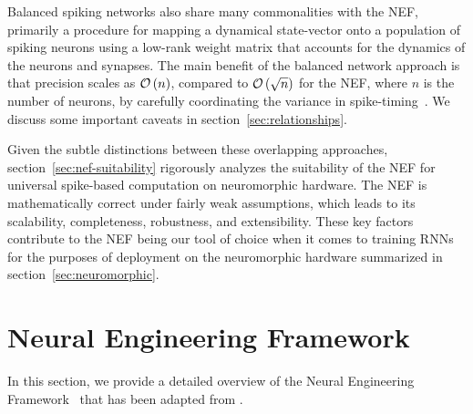 Balanced spiking networks also share many commonalities with the NEF, primarily a procedure for mapping a dynamical state-vector onto a population of spiking neurons using a low-rank weight matrix that accounts for the dynamics of the neurons and synapses.
The main benefit of the balanced network approach is that precision scales as $\mathcal{O}\left({n}\right)$, compared to $\mathcal{O}\left({\sqrt{n}}\right)$ for the NEF, where $n$ is the number of neurons, by carefully coordinating the variance in spike-timing~\citep[][Figure~11]{boahen2017neuromorph}.
We discuss some important caveats in section~\ref{sec:relationships}.

Given the subtle distinctions between these overlapping approaches,
section~\ref{sec:nef-suitability} rigorously analyzes the suitability of the NEF for universal spike-based computation on neuromorphic hardware.
The NEF is mathematically correct under fairly weak assumptions, which leads to its scalability, completeness, robustness, and extensibility.
These key factors contribute to the NEF being our tool of choice when it comes to training RNNs for the purposes of deployment on the neuromorphic hardware summarized in section~\ref{sec:neuromorphic}.

\section{Neural Engineering Framework}
\label{sec:nef}

In this section, we provide a detailed overview of the Neural Engineering Framework~\citep[NEF;][]{eliasmith2003a} that has been adapted from \citet{voelker2018}.



